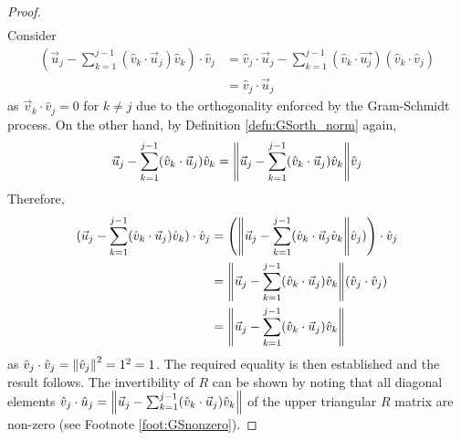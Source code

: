 \begin{proof}
\begin{align*}
\end{align*}
Consider
\begin{align*}
(\vec{u}_j - \sum_{k=1}^{j-1}(\hat{v}_k \cdot \vec{u}_j)\hat{v}_k) \cdot \hat{v}_j &= \hat{v}_j \cdot \vec{u}_j - \sum_{k=1}^{j-1}(\hat{v}_k \cdot \vec{u_j}) (\hat{v}_k \cdot \hat{v}_j)\\
&= \hat{v}_j \cdot \vec{u}_j 
\end{align*}
as $\vec{v}_k \cdot \hat{v}_j = 0$ for $k \neq j$ due to the orthogonality enforced by the Gram-Schmidt process. On the other hand, by Definition \ref{defn:GSorth_norm} again, 
\begin{align*}
\vec{u}_j - \sum_{k=1}^{j-1}(\hat{v}_k \cdot \vec{u}_j)\hat{v}_k = \norm{\vec{u}_j - \sum_{k=1}^{j-1}(\hat{v}_k \cdot \vec{u}_j)\hat{v}_k} \hat{v}_j
\end{align*}
Therefore,
\begin{align*}
(\vec{u}_j - \sum_{k=1}^{j-1}(\hat{v}_k \cdot \vec{u}_j)\hat{v}_k) \cdot \hat{v}_j &= \left(\norm{\vec{u}_j - \sum_{k=1}^{j-1}(\hat{v}_k \cdot \vec{u}_j\hat{v}_k} \hat{v}_j)\right) \cdot \hat{v}_j \\
&= \norm{\vec{u}_j - \sum_{k=1}^{j-1}(\hat{v}_k \cdot \vec{u}_j)\hat{v}_k} (\hat{v}_j \cdot \hat{v}_j) \\
&= \norm{\vec{u}_j - \sum_{k=1}^{j-1}(\hat{v}_k \cdot \vec{u}_j)\hat{v}_k}
\end{align*}
as $\hat{v}_j \cdot \hat{v}_j = \norm{\hat{v}_j}^2 = 1^2 = 1$. The required equality is then established and the result follows. The invertibility of $R$ can be shown by noting that all diagonal elements $\hat{v}_j \cdot \hat{u}_j = {\norm{\vec{u}_j - \sum_{k=1}^{j-1}(\hat{v}_k \cdot \vec{u}_j)\hat{v}_k}} $ of the upper triangular $R$ matrix are non-zero (see Footnote \ref{foot:GSnonzero}). 
\end{proof}

